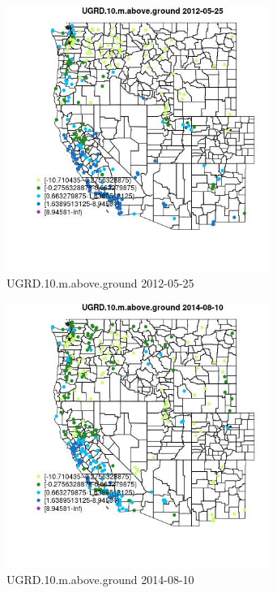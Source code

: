 \begin{figure} 
\centering  
\includegraphics[width=0.77\textwidth]{Code_Outputs/Report_ML_input_PM25_Step4_part_e_de_duplicated_aves_compiled_2019-05-18wNAs_MapObsUGRD10maboveground2012-05-25.jpg} 
\caption{\label{fig:Report_ML_input_PM25_Step4_part_e_de_duplicated_aves_compiled_2019-05-18wNAsMapObsUGRD10maboveground2012-05-25}UGRD.10.m.above.ground 2012-05-25} 
\end{figure} 
 

\begin{figure} 
\centering  
\includegraphics[width=0.77\textwidth]{Code_Outputs/Report_ML_input_PM25_Step4_part_e_de_duplicated_aves_compiled_2019-05-18wNAs_MapObsUGRD10maboveground2014-08-10.jpg} 
\caption{\label{fig:Report_ML_input_PM25_Step4_part_e_de_duplicated_aves_compiled_2019-05-18wNAsMapObsUGRD10maboveground2014-08-10}UGRD.10.m.above.ground 2014-08-10} 
\end{figure} 
 

